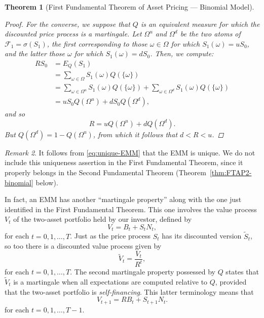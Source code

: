 \documentclass[11pt, openany, oneside]{book}
\newtheorem{thm}{Theorem}[section]
\theoremstyle{definition}
\theoremstyle{remark}
\newtheorem{rmk}[thm]{Remark}
\theoremstyle{boldital}
\numberwithin{equation}{section}
\begin{document}
\begin{thm}[First Fundamental Theorem of Asset Pricing --- Binomial Model]
\begin{proof}
For the converse, we suppose that $Q$ is an equivalent measure for which the discounted price process is a martingale. Let $\Omega^u$ and $\Omega^d$ be the two atoms of $\mathcal{F}_1 = \sigma(S_1)$, the first corresponding to those $\omega\in \Omega$ for which $S_1(\omega) = uS_0$, and the latter those $\omega$ for which $S_1(\omega) = dS_0$. Then, we compute:
	\begin{align*}
	RS_0 &= E_Q\left(S_1\right) \\
	&= \sum_{\omega\in \Omega} S_1(\omega) Q(\{\omega\}) \\
	&=\sum_{\omega\in \Omega^u} S_1(\omega) Q(\{\omega\}) + \sum_{\omega\in \Omega^d} S_1(\omega) Q(\{\omega\}) \\
	&= uS_0Q(\Omega^u) + dS_0Q(\Omega^d),
	\end{align*}
and so
	\begin{equation}\label{eq:unique-EMM}
	R = uQ(\Omega^u) + dQ(\Omega^d).
	\end{equation}
But $Q(\Omega^d) = 1 - Q(\Omega^u)$, from which it follows that $d < R < u$. 
\end{proof}
\end{thm}

\begin{rmk}\label{rmk:unique-EMM}
It follows from \eqref{eq:unique-EMM} that the EMM is unique. We do not include this uniqueness assertion in the First Fundamental Theorem, since it properly belongs in the Second Fundamental Theorem (Theorem~\ref{thm:FTAP2-binomial} below).
\end{rmk}


In fact, an EMM has another ``martingale property'' along with the one just identified in the First Fundamental Theorem. This one involves the value process $V_t$ of the two-asset portfolio held by our investor, defined by
	\begin{equation}\label{eq:value-process}
	V_t = B_t + S_tN_t,
	\end{equation}
for each $t=0,1,\ldots,T$. Just as the price process $S_t$ has its discounted version $\tilde{S}_t$, so too there is a discounted value process given by
	\[
	\tilde{V}_t = \frac{V_t}{R^t},
	\]
for each $t=0,1,\ldots,T$. The second martingale property possessed by $Q$ states that $\tilde{V}_t$ is a martingale when all expectations are computed relative to $Q$, provided that the two-asset portfolio is \textit{self-financing}. This latter terminology means that
	\begin{equation}\label{eq:self-finance}
	V_{t+1} = RB_t + S_{t+1}N_t.
	\end{equation}
for each $t=0,1,\ldots,T-1$.
	
\end{document}
